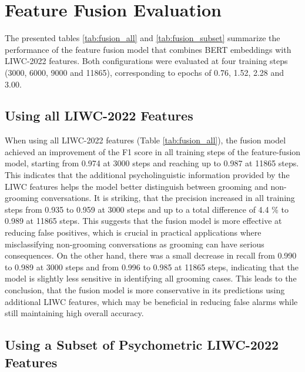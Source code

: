 \section{Feature Fusion Evaluation}




The presented tables \ref{tab:fusion_all} and \ref{tab:fusion_subset} summarize the performance of the feature fusion model that combines BERT embeddings with LIWC-2022 features. Both configurations were evaluated at four training steps (3000, 6000, 9000 and 11865), corresponding to epochs of 0.76, 1.52, 2.28 and 3.00.

\subsection{Using all LIWC-2022 Features}

When using all LIWC-2022 features (Table \ref{tab:fusion_all}), the fusion model achieved an improvement of the F1 score in all training steps of the feature-fusion model, starting from 0.974 at 3000 steps and reaching up to 0.987 at 11865 steps. This indicates that the additional psycholinguistic information provided by the LIWC features helps the model better distinguish between grooming and non-grooming conversations. It is striking, that the precision increased in all training steps from 0.935 to 0.959 at 3000 steps and up to a total difference of 4.4 \% to 0.989 at 11865 steps. This suggests that the fusion model is more effective at reducing false positives, which is crucial in practical applications where misclassifying non-grooming conversations as grooming can have serious consequences. On the other hand, there was a small decrease in recall from 0.990 to 0.989 at 3000 steps and from 0.996 to 0.985 at 11865 steps, indicating that the model is slightly less sensitive in identifying all grooming cases. This leads to the conclusion, that the fusion model is more conservative in its predictions using additional LIWC features, which may be beneficial in reducing false alarms while still maintaining high overall accuracy.


\subsection{Using a Subset of Psychometric LIWC-2022 Features}

